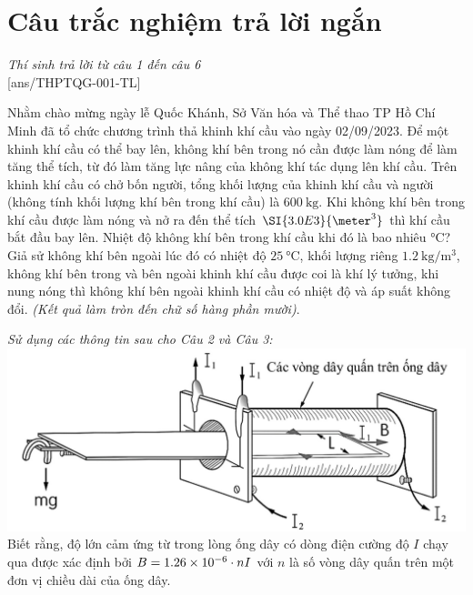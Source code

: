 \section{Câu trắc nghiệm trả lời ngắn} \textit{Thí sinh trả lời từ câu 1 đến câu 6}\\
\setcounter{ex}{0}
[ans/THPTQG-001-TL]
\begin{ex}
	Nhằm chào mừng ngày lễ Quốc Khánh, Sở Văn hóa và Thể thao TP Hồ Chí Minh đã tổ chức chương trình thả khinh khí cầu vào ngày 02/09/2023. Để một khinh khí cầu có thể bay lên, không khí bên trong nó cần được làm nóng  để làm tăng thể tích, từ đó làm tăng lực nâng của không khí tác dụng lên khí cầu. Trên khinh khí cầu có chở bốn người, tổng khối lượng của khinh khí cầu và người (không tính khối lượng khí bên trong khí cầu) là $\SI{600}{\kilogram}$. Khi không khí bên trong khí cầu được làm nóng và nở ra đến thể tích $\SI{3.0E3}{\meter^3}$ thì khí cầu bắt đầu bay lên. Nhiệt độ không khí bên trong khí cầu khi đó là bao nhiêu $\si{\celsius}$? Giả sử không khí bên ngoài lúc đó có nhiệt độ $\SI{25}{\celsius}$, khối lượng riêng $\SI{1.2}{\kilogram/\meter^3}$, không khí bên trong và bên ngoài khinh khí cầu được coi là khí lý tưởng, khi nung nóng thì không khí bên ngoài khinh khí cầu có nhiệt độ và áp suất không đổi. \textit{(Kết quả làm tròn đến chữ số hàng phần mười)}.
	\shortans[oly]{ }
	\loigiai{
		
	}
\end{ex}
\textit{Sử dụng các thông tin sau cho Câu 2 và Câu 3:}
{\includegraphics[scale=0.4]{../figs/THPTQG-001-4}}
Biết rằng, độ lớn cảm ứng từ trong lòng ống dây có dòng điện cường độ $I$ chạy qua được xác định bởi $B=\SI{1.26E-6}{}\cdot nI$ với $n$ là số vòng dây quấn trên một đơn vị chiều dài của ống dây.
